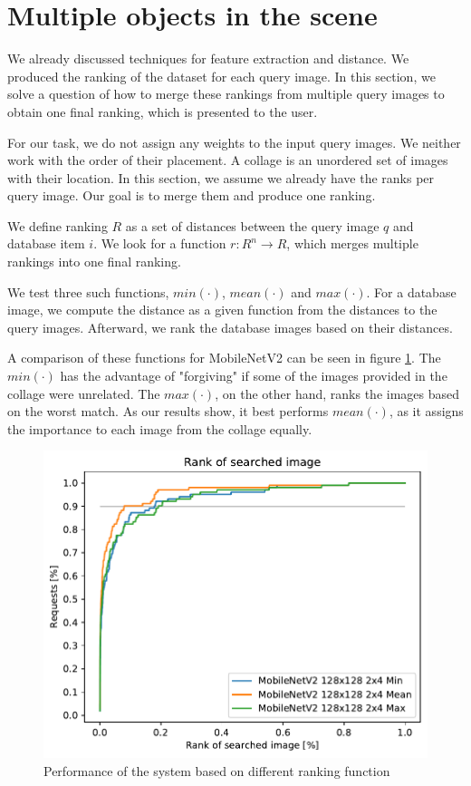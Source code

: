 \section{Multiple objects in the scene}

We already discussed techniques for feature extraction and distance. We produced the ranking of the dataset for each query image. In this section, we solve a question of how to merge these rankings from multiple query images to obtain one final ranking, which is presented to the user.

For our task, we do not assign any weights to the input query images. We neither work with the order of their placement. A collage is an unordered set of images with their location. In this section, we assume we already have the ranks per query image. Our goal is to merge them and produce one ranking.

We define ranking $R$ as a set of distances between the query image $q$ and database item $i$. We look for a function $r: R^n \rightarrow R$, which merges multiple rankings into one final ranking.

We test three such functions, $min(\cdot)$, $mean(\cdot)$ and $max(\cdot)$.  For a database image, we compute the distance as a given function from the distances to the query images. Afterward, we rank the database images based on their distances. 

A comparison of these functions for MobileNetV2 can be seen in figure \ref{fig:ranking_funcs}. The $min(\cdot)$ has the advantage of "forgiving" if some of the images provided in the collage were unrelated. The $max(\cdot)$, on the other hand, ranks the images based on the worst match. As our results show, it best performs $mean(\cdot)$, as it assigns the importance to each image from the collage equally.

\begin{figure}
\centering
\includegraphics[width=0.8\linewidth]{graphs/70c56dc52be92e048f57b9bdfb35ddce2be41fd2454ae360588da2e387b09de5.pdf}
\caption{Performance of the system based on different ranking function}
\label{fig:ranking_funcs}
\end{figure}

